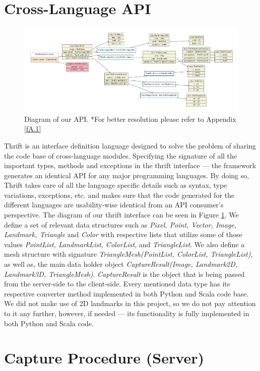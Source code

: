 \section{Cross-Language API}
\begin{figure}
  \centering
  \includegraphics[width=\textwidth]{Figures/thrift/Rs-ex.pdf}
  \caption{Diagram of our API. *For better resolution please refer to Appendix \ref{fA.1}}
  \label{f3.3}
\end{figure}

Thrift is an interface definition language designed to solve the problem of sharing the code base of cross-language modules. Specifying the signature of all the important types, methods and exceptions in the thrift interface — the framework generates an identical API for any major programming languages. By doing so, Thrift takes care of all the language specific details such as syntax, type variations, exceptions, etc. and makes sure that the code generated for the different languages are usability-wise identical from an API consumer's perspective. The diagram of our thrift interface can be seen in Figure \ref{f3.3}. We define a set of relevant data structures such as \textit{Pixel, Point, Vector, Image, Landmark, Triangle} and \textit{Color} with respective lists that utilize some of those values \textit{PointList, LandmarkList, ColorList}, and \textit{TriangleList}. We also define a mesh structure with signature \textit{TriangleMesh(PointList, ColorList, TriangleList)}, as well as, the main data holder object \textit{CaptureResult(Image, Landmark2D, Landmark3D, TriangleMesh)}. \textit{CaptureResult} is the object that is being passed from the server-side to the client-side. Every mentioned data type has its respective converter method implemented in both Python and Scala code base. We did not make use of 2D landmarks in this project, so we do not pay attention to it any further, however, if needed — its functionality is fully implemented in both Python and Scala code. 


\section{Capture Procedure (Server)}\label{s3.3}

